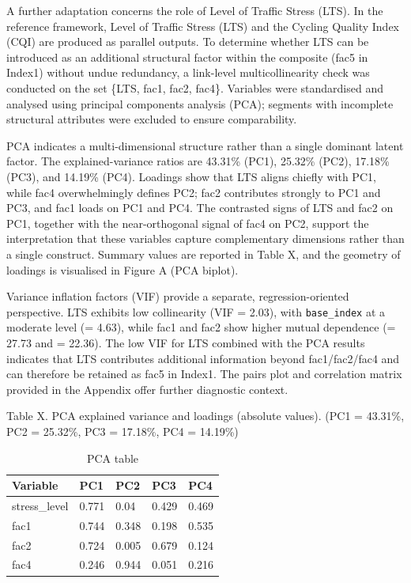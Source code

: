 \documentclass[
  12pt,
  oneside]{book}
\begin{document}
A further adaptation concerns the role of Level of Traffic Stress (LTS). In the reference framework, Level of Traffic Stress (LTS) and the Cycling Quality Index (CQI) are produced as parallel outputs. To determine whether LTS can be introduced as an additional structural factor within the composite (fac5 in Index1) without undue redundancy, a link-level multicollinearity check was conducted on the set \{LTS, fac1, fac2, fac4\}. Variables were standardised and analysed using principal components analysis (PCA); segments with incomplete structural attributes were excluded to ensure comparability.

PCA indicates a multi-dimensional structure rather than a single dominant latent factor. The explained-variance ratios are 43.31\% (PC1), 25.32\% (PC2), 17.18\% (PC3), and 14.19\% (PC4). Loadings show that LTS aligns chiefly with PC1, while fac4 overwhelmingly defines PC2; fac2 contributes strongly to PC1 and PC3, and fac1 loads on PC1 and PC4. The contrasted signs of LTS and fac2 on PC1, together with the near-orthogonal signal of fac4 on PC2, support the interpretation that these variables capture complementary dimensions rather than a single construct. Summary values are reported in Table X, and the geometry of loadings is visualised in Figure A (PCA biplot).

Variance inflation factors (VIF) provide a separate, regression-oriented perspective. LTS exhibits low collinearity (VIF = 2.03), with \texttt{base\_index} at a moderate level (= 4.63), while fac1 and fac2 show higher mutual dependence (= 27.73 and = 22.36). The low VIF for LTS combined with the PCA results indicates that LTS contributes additional information beyond fac1/fac2/fac4 and can therefore be retained as fac5 in Index1. The pairs plot and correlation matrix provided in the Appendix offer further diagnostic context.

Table X. PCA explained variance and loadings (absolute values).
(PC1 = 43.31\%, PC2 = 25.32\%, PC3 = 17.18\%, PC4 = 14.19\%)

\begin{table}
\centering
\caption{\label{tab:PCA}PCA table}
\centering
\begin{tabular}[t]{lllll}
\toprule
\textbf{Variable} & \textbf{PC1} & \textbf{PC2} & \textbf{PC3} & \textbf{PC4}\\
\midrule
stress\_level & 0.771 & 0.04 & 0.429 & 0.469\\
fac1 & 0.744 & 0.348 & 0.198 & 0.535\\
fac2 & 0.724 & 0.005 & 0.679 & 0.124\\
fac4 & 0.246 & 0.944 & 0.051 & 0.216\\
\bottomrule
\end{tabular}
\end{table}
\end{document}
